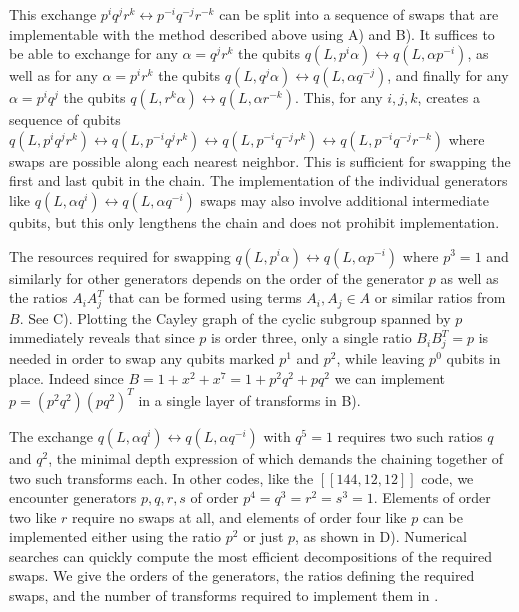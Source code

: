 \documentclass{article}
\begin{document}
This exchange $p^i q^j r^k \leftrightarrow p^{-i} q^{-j} r^{-k}$ can be split into a sequence of swaps that are implementable with the method described above using  A) and B). It suffices to be able to exchange for any $\alpha = q^j r^k$ the qubits $q(L,p^i \alpha) \leftrightarrow q(L,\alpha p^{-i})$, as well as for any $\alpha = p^i r^k$ the qubits $q(L,q^j \alpha) \leftrightarrow q(L,\alpha q^{-j})$, and finally for any $\alpha = p^i q^j$ the qubits $q(L,r^k \alpha) \leftrightarrow q(L,\alpha r^{-k})$. This, for any $i,j,k$, creates a sequence of qubits $q(L,p^i q^j r^k) \leftrightarrow q(L,p^{-i} q^{j} r^{k})  \leftrightarrow q(L,p^{-i} q^{-j} r^{k})  \leftrightarrow q(L,p^{-i} q^{-j} r^{-k}) $ where swaps are possible along each nearest neighbor.  This is sufficient for swapping the first and last qubit in the chain. The implementation of the individual generators like $q(L,\alpha q^i) \leftrightarrow q(L,\alpha q^{-i})$ swaps may also involve additional intermediate qubits, but this only lengthens the chain and does not prohibit implementation.


The resources required for swapping $q(L,p^i \alpha) \leftrightarrow q(L,\alpha p^{-i})$ where $p^3 = 1$ and similarly for other generators depends on the order of the generator $p$ as well as the ratios $A_iA_j^T$ that can be formed using terms $A_i,A_j \in  A$ or similar ratios from $B$. See  C). Plotting the Cayley graph of the cyclic subgroup spanned by $p$ immediately reveals that since $p$ is order three, only a single ratio $B_iB_j^T = p$ is needed in order to swap any qubits marked $p^1$ and $p^2$, while leaving $p^0$ qubits in place. Indeed since $B = 1 + x^2 + x^7 = 1 + p^2 q^2 + p q^2$ we can implement $p = (p^2 q^2)(p q^2)^T$ in a single layer of transforms in  B). 

The exchange $q(L,\alpha q^i ) \leftrightarrow q(L,\alpha q^{-i})$ with $q^5 = 1$ requires two such ratios $q$ and $q^2$, the minimal depth expression of which demands the chaining together of two such transforms each. In other codes, like the $[[144,12,12]]$ code, we encounter generators $p,q,r,s$ of order $p^4 = q^3 = r^2 = s^3 = 1$. Elements of order two like $r$ require no swaps at all, and elements of order four like $p$ can be implemented either using the ratio $p^2$ or just $p$, as shown in  D). Numerical searches can quickly compute the most efficient decompositions of the required swaps. We give the orders of the generators, the ratios defining the required swaps, and the number of transforms required to implement them in .  
\end{document}
